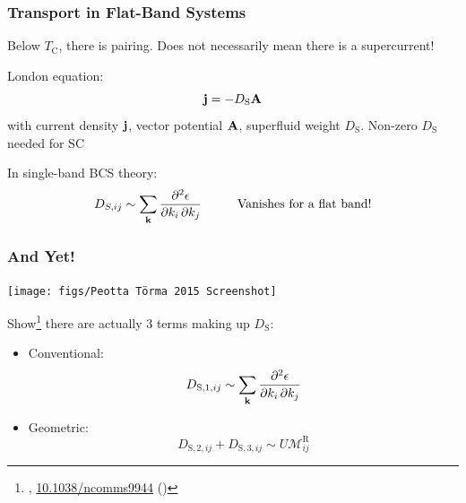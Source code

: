\documentclass[aspectratio=169]{beamer}
\begin{document}
\begin{frame}
	\frametitle{Transport in Flat-Band Systems}
	
	\begin{block}{}
		\begin{center}
			Below \(T_{\textrm{C}}\), there is pairing.
			Does not necessarily mean there is a supercurrent!
		\end{center}
	\end{block}\pause
	London equation:
	\begin{equation}
		\mathbf{j} = -D_{\textrm{S}} \mathbf{A}
	\end{equation}
	with current density \(\mathbf{j}\), vector potential \(\mathbf{A}\), superfluid weight \(D_{\textrm{S}}\).
	Non-zero \(D_{\textrm{S}}\) needed for SC\pause
	
	In single-band BCS theory:
	\begin{equation}
		D_{S, ij} \sim \sum_{\mathbf{k}} \pdv{\epsilon}{k_i,k_j} \hspace{1cm} \text{Vanishes for a flat band!}
	\end{equation}
\end{frame}


\begin{frame}
	\frametitle{And Yet!}
	
	\begin{center}
		\texttt{[image: figs/Peotta Törma 2015 Screenshot]}
	\end{center}\pause
	
	Show\footnote<2->[frame]{\footnotesize \citeauthor{peottaSuperfluidityTopologicallyNontrivial2015}, \href{https://doi.org/10.1038/ncomms9944}{10.1038/ncomms9944} (\citeyear{peottaSuperfluidityTopologicallyNontrivial2015})} there are actually 3 terms making up \(D_{\textrm{S}}\):
	
	\begin{itemize}
		\item Conventional:
		\begin{equation}
			D_{\textrm{S}, 1, ij} \sim \sum_{\mathbf{k}} \pdv{\epsilon}{k_i,k_j}
		\end{equation}\pause
		\item Geometric: 
		\begin{equation}
			D_{\textrm{S}, 2, ij} + D_{\textrm{S}, 3, ij} \sim U \mathcal{M}_{ij}^{\textrm{R}}
		\end{equation}
	\end{itemize}
\end{frame}
\end{document}
